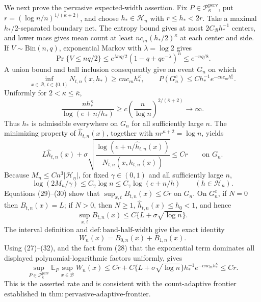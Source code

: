 We next prove the pervasive expected-width assertion. Fix \(P\in\mathcal P_{\kappa}^{\mathrm{perv}}\), put \(r=(\log n/n)^{1/(\kappa+2)}\), and choose \(h_*\in\mathcal H_n\) with \(r\le h_*<2r\). Take a maximal \(h_*/2\)-separated boundary net. The entropy bound gives at most \(2C_{\mathcal B}h_*^{-1}\) centers, and lower mass gives mean count at least \(nc_m(h_*/2)^{\kappa}\) at each center and side. If \(V\sim\mathrm{Bin}(n,q)\), exponential Markov with \(\lambda=\log2\) gives
\[
\Pr\{V\le nq/2\}
\le e^{\lambda nq/2}(1-q+qe^{-\lambda})^n
\le e^{-nq/8}. \tag{26}
\]
A union bound and ball inclusion consequently give an event \(G_n\) on which
\[
\inf_{x\in\mathcal B,\,t\in\{0,1\}}N_{t,n}(x,h_*)
\ge cnc_mh_*^{\kappa},
\qquad
P(G_n^c)\le Ch_*^{-1}e^{-cnc_mh_*^{\kappa}}. \tag{27}
\]
Uniformly for \(2<\kappa\le\overline\kappa\),
\[
\frac{nh_*^{\kappa}}{\log(e+n/h_*)}
\ge c\left(\frac n{\log n}\right)^{2/(\overline\kappa+2)}\longrightarrow\infty. \tag{28}
\]
Thus \(h_*\) is admissible everywhere on \(G_n\) for all sufficiently large \(n\). The minimizing property of \(\widehat h_{t,n}(x)\), together with \(nr^{\kappa+2}=\log n\), yields
\[
L\widehat h_{t,n}(x)+
\sigma\sqrt{\frac{\log(e+n/\widehat h_{t,n}(x))}
{N_{t,n}(x,\widehat h_{t,n}(x))}}
\le Cr \qquad\text{on }G_n. \tag{29}
\]
Because \(M_n\le Cn^3|\mathcal H_n|\), for fixed \(\gamma\in(0,1)\) and all sufficiently large \(n\),
\[
\log(2M_n/\gamma)\le C_\gamma\log n
\le C_\gamma\log(e+n/h) \qquad(h\in\mathcal H_n). \tag{30}
\]
Equations (29)--(30) show that \(\sup_{x,t}B_{t,n}(x)\le Cr\) on \(G_n\). On \(G_n^c\), if \(N=0\) then \(B_{t,n}(x)=L\); if \(N>0\), then \(N\ge1\), \(\widehat h_{t,n}(x)\le h_0<1\), and hence
\[
\sup_{x,t}B_{t,n}(x)\le C\{L+\sigma\sqrt{\log n}\}. \tag{31}
\]
The interval definition and \(\mathrm{def:band\text{-}half\text{-}width}\) give the exact identity
\[
W_n(x)=B_{0,n}(x)+B_{1,n}(x). \tag{32}
\]
Using (27)--(32), and the fact from (28) that the exponential term dominates all displayed polynomial-logarithmic factors uniformly, gives
\[
\sup_{P\in\mathcal P_{\kappa}^{\mathrm{perv}}}
\mathbb E_P\sup_{x\in\mathcal B}W_n(x)
\le Cr+C\{L+\sigma\sqrt{\log n}\}h_*^{-1}e^{-cnc_mh_*^{\kappa}}
\le Cr. \tag{33}
\]
This is the asserted rate and is consistent with the count-adaptive frontier established in \(\mathrm{thm:pervasive\text{-}adaptive\text{-}frontier}\).


